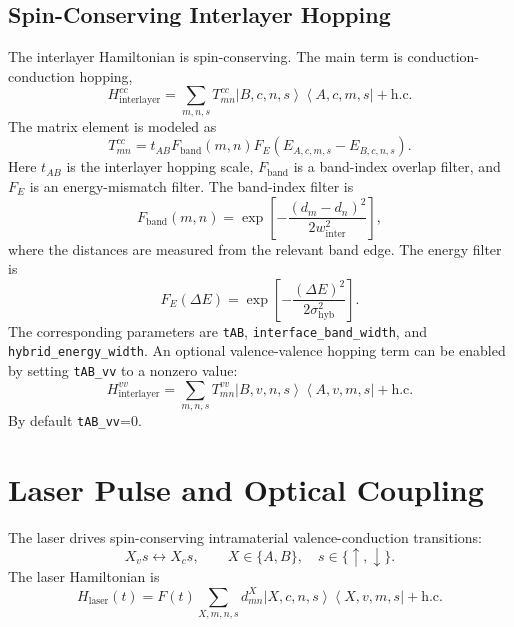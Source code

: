 \documentclass[11pt,a4paper]{article}
\newcommand{\ket}[1]{\left|#1\right\rangle}
\newcommand{\bra}[1]{\left\langle #1\right|}
\begin{document}
\subsection{Spin-Conserving Interlayer Hopping}

The interlayer Hamiltonian is spin-conserving.  The main term is conduction-conduction hopping,
\begin{equation}
H_{\mathrm{interlayer}}^{cc}
=
\sum_{m,n,s}
T^{cc}_{mn}
\ket{B,c,n,s}\bra{A,c,m,s}
+\mathrm{h.c.}
\end{equation}
The matrix element is modeled as
\begin{equation}
T^{cc}_{mn}
=
 t_{AB}
 F_{\mathrm{band}}(m,n)
 F_E(E_{A,c,m,s}-E_{B,c,n,s}).
\end{equation}
Here $t_{AB}$ is the interlayer hopping scale, $F_{\mathrm{band}}$ is a band-index overlap filter, and $F_E$ is an energy-mismatch filter.  The band-index filter is
\begin{equation}
F_{\mathrm{band}}(m,n)
=\exp\left[-\frac{(d_m-d_n)^2}{2w_{\mathrm{inter}}^2}\right],
\end{equation}
where the distances are measured from the relevant band edge.  The energy filter is
\begin{equation}
F_E(\Delta E)=
\exp\left[-\frac{(\Delta E)^2}{2\sigma_{\mathrm{hyb}}^2}\right].
\end{equation}
The corresponding parameters are \texttt{tAB}, \texttt{interface\_band\_width}, and \texttt{hybrid\_energy\_width}.  An optional valence-valence hopping term can be enabled by setting \texttt{tAB\_vv} to a nonzero value:
\begin{equation}
H_{\mathrm{interlayer}}^{vv}
=
\sum_{m,n,s}
T^{vv}_{mn}
\ket{B,v,n,s}\bra{A,v,m,s}+\mathrm{h.c.}
\end{equation}
By default \texttt{tAB\_vv}=0.

\section{Laser Pulse and Optical Coupling}

The laser drives spin-conserving intramaterial valence-conduction transitions:
\begin{equation}
X_v s \leftrightarrow X_c s,
\qquad
X\in\{A,B\},\quad s\in\{\uparrow,\downarrow\}.
\end{equation}
The laser Hamiltonian is
\begin{equation}
H_{\mathrm{laser}}(t)
=
F(t)
\sum_{X,m,n,s}
 d^X_{mn}
\ket{X,c,n,s}\bra{X,v,m,s}
+\mathrm{h.c.}
\end{equation}
\end{document}

